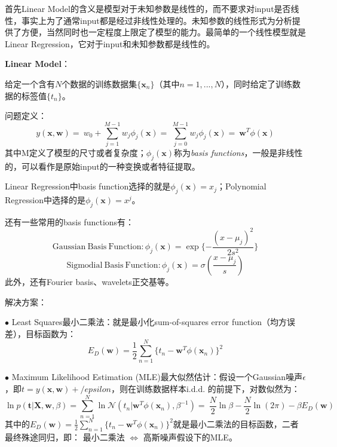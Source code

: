 \documentclass[paper=a4,fontsize=11pt]{xetexpNote}
\begin{document}
\sepspace
{}
\sepspace


\begin{compactitem}[\color{RoyalBlue}$\circ$]
	\item 首先Linear Model的含义是模型对于未知参数是线性的，而不要求对input是否线性，事实上为了通常input都是经过非线性处理的。未知参数的线性形式为分析提供了方便，当然同时也一定程度上限定了模型的能力。最简单的一个线性模型就是Linear Regression，它对于input和未知参数都是线性的。
    \item \textbf{Linear Model}：

    \qquad 给定一个含有$N$个数据的训练数据集$\{\mathbf{x}_n\}$（其中$n=1,...,N$），同时给定了训练数据的标签值$\{t_n\}$。

    \checkmark \textcolor[rgb]{1.00,0.00,0.00}{问题定义}：\[ y(\mathbf{x}, \mathbf{w}) =    \
                                                w_0 + \sum_{j=1}^{M-1} w_j \phi_j(\mathbf{x}) = \
                                                \sum_{j=0}^{M-1} w_j \phi_j(\mathbf{x}) = \
                                                \mathbf{w}^T \phi(\mathbf{x}) \]
    \qquad 其中M定义了模型的尺寸或者复杂度；$\phi_j(\mathbf{x})$称为\emph{basis functions}，一般是非线性的，可以看作是原始input的一种变换或者特征提取。

    \qquad Linear Regression中basis function选择的就是$\phi_j(\mathbf{x}) = x_j$；Polynomial Regression中选择的是$\phi_j(\mathbf{x}) = x^j$。

    \qquad 还有一些常用的basis functions有：
    \[ \mathrm{Gaussian\ Basis\ Function:} \phi_j(\mathbf{x}) = \exp\{ -\frac{(x-\mu_j)^2}{2s^2} \} \]
    \[ \mathrm{Sigmodial\ Basis\ Function:} \phi_j(\mathbf{x}) = \sigma( \frac{x-\mu_j}{s} ) \]
    此外，还有Fourier basis、wavelets正交基等。

    \checkmark \textcolor[rgb]{1.00,0.00,0.00}{解决方案}：

    $\bullet$ Least Squares最小二乘法：就是最小化sum-of-squares error function（均方误差），目标函数为：
    \[ E_D(\mathbf{w}) = \frac{1}{2} \sum_{n=1}^{N}\{t_n - \mathbf{w}^T \phi(\mathbf{x}_n)\} ^ 2 \]

    $\bullet$ Maximum Likelihood Estimation (MLE)最大似然估计：假设一个Gaussian噪声$\epsilon$，即$t = y(\mathbf{x}, \mathbf{w}) + /epsilon$，则在训练数据样本i.d.d. 的前提下，对数似然为：
    \[ \ln p(\mathbf{t} | \mathbf{X}, \mathbf{w}, \beta) = \sum_{n=1}^{N} \ln \mathcal{N}( t_n | \mathbf{w}^T \phi(\mathbf{x}_n), \beta^{-1} ) =\
    \frac{N}{2} \ln \beta - \frac{N}{2} \ln (2 \pi) - \beta E_D(\mathbf{w})\]
    其中的$ E_D(\mathbf{w}) = \frac{1}{2} \sum_{n=1}^{N}\{t_n - \mathbf{w}^T \phi(\mathbf{x}_n)\} ^ 2 $就是最小二乘法的目标函数，二者最终殊途同归，即：
    \textcolor[rgb]{0.00,0.07,1.00}{最小二乘法 $\Longleftrightarrow$ 高斯噪声假设下的MLE}。



\end{compactitem}
\end{document}
